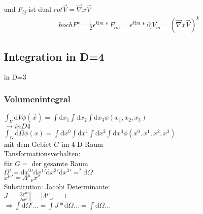 \documentclass[a4paper]{article}
\begin{document}
und $F_{ij}$ ist dual $rot\vec{V}=\vec{\nabla} x \vec{V}$\\
\begin{align}
~hochF^k=\frac{1}{2}\epsilon^{klm}*F_{lm}=\epsilon^{klm}*\partial_l
V_m=(\vec{\nabla}x\vec{V})^k
\end{align}

\subsection{Integration in D=4}
in D=3 
\subsubsection{Volumenintegral} $\int_V \mathrm{d}V \phi(\vec{x})=\int \mathrm{d}x_1 \int \mathrm{d}x_2
  \int \mathrm{d}x_3 \phi(x_1,x_2,x_3)$ \\
  $\rightarrow in D4 $\\ $\int_G \mathrm{d}\Omega \phi(x)=\int \mathrm{d}x^0\int \mathrm{d}x^1 \int \mathrm{d}x^2
  \int \mathrm{d}x^3 \phi(x^0,x^1,x^2,x^3)$\\ mit dem Gebiet $G$ im 4-D Raum\\
  Tansformationsverhalten: \\ für $G=$ der gesamte Raum
  \\$\Omega'=\mathrm{d}x^0{}'\mathrm{d}x^1{}'\mathrm{d}x^2{}'\mathrm{d}x^3{}'=^?\mathrm{d}\Omega$\\$x^\mu{}'=\Lambda^\mu{}_\nu
  x^\nu$\\ 
  Substitution: Jacobi Determinante:\\ $J=\left|\frac{\partial
  x^\mu{}'}{\partial x^\nu}\right|=\left|\Lambda^\mu{}_\nu\right|=1$ \\ 
  $\Rightarrow \int \mathrm{d}\Omega'\ldots=\int J*\mathrm{d}\Omega\ldots=\int \mathrm{d}\Omega\ldots$
\end{document}
